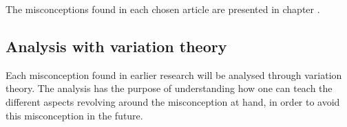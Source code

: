 The misconceptions found in each chosen article are presented in chapter . 


\subsection{Analysis with variation theory}

Each misconception found in earlier research will be analysed through variation theory. The analysis has the purpose of understanding how one can teach the different aspects revolving around the misconception at hand, in order to avoid this misconception in the future. 